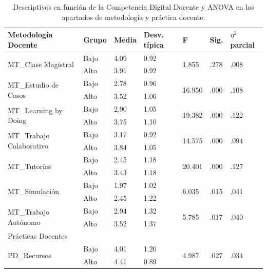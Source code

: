 \documentclass[spanish]{textolivre}
\begin{document}
\begin{table}[h]
    \centering
    \begin{threeparttable}
    \caption{Descriptivos en función de la Competencia Digital Docente y ANOVA en los apartados de metodología y práctica docente.}
    \label{tab06}
    \begin{tabular}{*{7}{l}}
    \toprule
    Metodología Docente & Grupo & Media & Desv. típica & F & Sig. & $\eta^2$ parcial \\
    \midrule
    \multirow{2}{*}{MT\_Clase Magistral} & Bajo & 4.09 & 0.92 & \multirow{2}{*}{1.855} & \multirow{2}{*}{.278} & \multirow{2}{*}{.008} \\
    & Alto & 3.91 &0.92 & & & \\
    \multirow{2}{*}{MT\_Estudio de Casos} & Bajo & 2.78 & 0.96 & \multirow{2}{*}{16.950} & \multirow{2}{*}{.000} & \multirow{2}{*}{.108} \\
    & Alto & 3.52 & 1.06 & & & \\
    \multirow{2}{*}{MT\_Learning by Doing} & Bajo & 2.90 & 1.05 & \multirow{2}{*}{19.382} &  \multirow{2}{*}{.000} & \multirow{2}{*}{.122} \\
    & Alto & 3.75 & 1.10 & & & \\
    \multirow{2}{*}{MT\_Trabajo Colaborativo} & Bajo & 3.17 & 0.92 & \multirow{2}{*}{14.575} & \multirow{2}{*}{.000} & \multirow{2}{*}{.094} \\
    & Alto & 3.84 & 1.05 & & & \\
    \multirow{2}{*}{MT\_Tutorías} & Bajo & 2.45 & 1.18 & \multirow{2}{*}{20.401} & \multirow{2}{*}{.000} & \multirow{2}{*}{.127} \\
    & Alto & 3.43 & 1.18 & & & \\
    \multirow{2}{*}{MT\_Simulación} & Bajo & 1.97 & 1.02 & \multirow{2}{*}{6.035} & \multirow{2}{*}{.015} & \multirow{2}{*}{.041} \\
    & Alto & 2.45 & 1.22 & & & \\
    \multirow{2}{*}{MT\_Trabajo Autónomo} & Bajo & 2.94 & 1.32 & \multirow{2}{*}{5.785} & \multirow{2}{*}{.017} & \multirow{2}{*}{.040} \\
    & Alto & 3.52 & 1.37 & & & \\
    \midrule
    Prácticas Docentes & & & & & & \\
    \midrule
    \multirow{2}{*}{PD\_Recursos} & Bajo & 4.01 & 1.20 & \multirow{2}{*}{4.987} & \multirow{2}{*}{.027} & \multirow{2}{*}{.034} \\
    & Alto & 4.41 & 0.89 & & & \\

\end{tabular}
\end{threeparttable}
\end{table}
\end{document}
